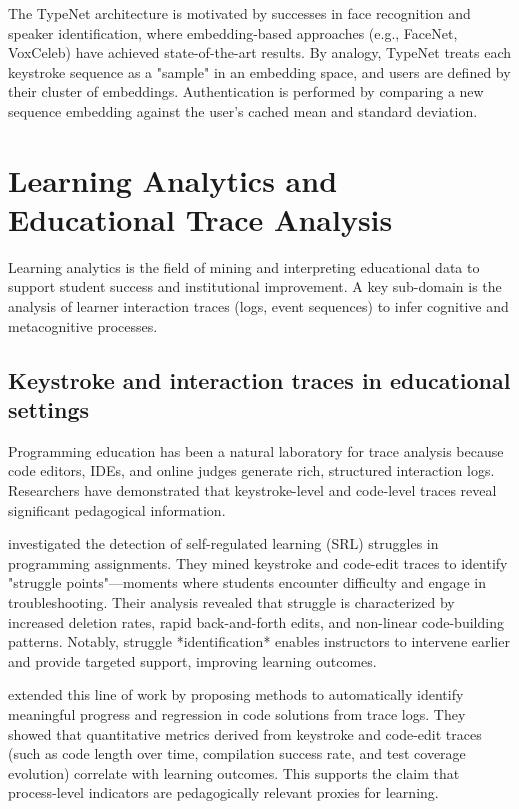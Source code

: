 The TypeNet architecture is motivated by successes in face recognition and speaker identification, where embedding-based approaches (e.g., FaceNet, VoxCeleb) have achieved state-of-the-art results. By analogy, TypeNet treats each keystroke sequence as a "sample" in an embedding space, and users are defined by their cluster of embeddings. Authentication is performed by comparing a new sequence embedding against the user's cached mean and standard deviation.

\section{Learning Analytics and Educational Trace Analysis}
\label{sec:learning-analytics}

Learning analytics is the field of mining and interpreting educational data to support student success and institutional improvement. A key sub-domain is the analysis of learner interaction traces (logs, event sequences) to infer cognitive and metacognitive processes.

\subsection{Keystroke and interaction traces in educational settings}

Programming education has been a natural laboratory for trace analysis because code editors, IDEs, and online judges generate rich, structured interaction logs. Researchers have demonstrated that keystroke-level and code-level traces reveal significant pedagogical information.

\citet{arakawa2021situ} investigated the detection of self-regulated learning (SRL) struggles in programming assignments. They mined keystroke and code-edit traces to identify "struggle points"—moments where students encounter difficulty and engage in troubleshooting. Their analysis revealed that struggle is characterized by increased deletion rates, rapid back-and-forth edits, and non-linear code-building patterns. Notably, struggle *identification* enables instructors to intervene earlier and provide targeted support, improving learning outcomes.

\citet{dong2021trace} extended this line of work by proposing methods to automatically identify meaningful progress and regression in code solutions from trace logs. They showed that quantitative metrics derived from keystroke and code-edit traces (such as code length over time, compilation success rate, and test coverage evolution) correlate with learning outcomes. This supports the claim that process-level indicators are pedagogically relevant proxies for learning.

